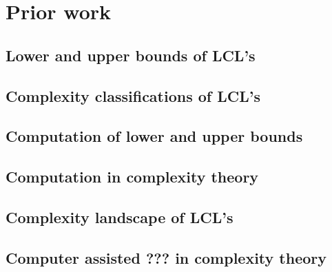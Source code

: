 
\section{Prior work} \label{sec:prior_work}


\subsection{}
\subsection{Lower and upper bounds of LCL's}
\subsection{Complexity classifications of LCL's}
\subsection{Computation of lower and upper bounds}
\subsection{Computation in complexity theory}
\subsection{Complexity landscape of LCL's}
\subsection{Computer assisted ??? in complexity theory}
